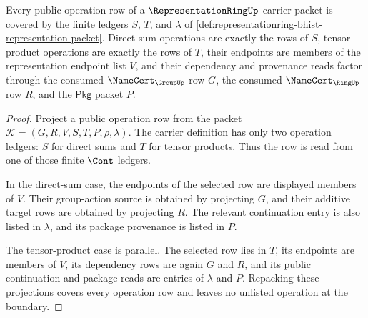 \begin{theorem}
\label{thm:representationring-operation-ledger-coverage}
Every public operation row of a $\RepresentationRingUp$ carrier packet is
covered by the finite ledgers $S$, $T$, and $\lambda$ of
\autoref{def:representationring-bhist-representation-packet}. Direct-sum
operations are exactly the rows of $S$, tensor-product operations are exactly
the rows of $T$, their endpoints are members of the representation endpoint
list $V$, and their dependency and provenance reads factor through the
consumed $\NameCert_{\GroupUp}$ row $G$, the consumed $\NameCert_{\RingUp}$
row $R$, and the $\mathsf{Pkg}$ packet $P$.
\end{theorem}
\begin{proof}
Project a public operation row from the packet
$\mathcal{K}=(G,R,V,S,T,P,\rho,\lambda)$. The carrier definition has only two
operation ledgers: $S$ for direct sums and $T$ for tensor products. Thus the
row is read from one of those finite $\Cont$ ledgers.

In the direct-sum case, the endpoints of the selected row are displayed
members of $V$. Their group-action source is obtained by projecting $G$, and
their additive target rows are obtained by projecting $R$. The relevant
continuation entry is also listed in $\lambda$, and its package provenance is
listed in $P$.

The tensor-product case is parallel. The selected row lies in $T$, its
endpoints are members of $V$, its dependency rows are again $G$ and $R$, and
its public continuation and package reads are entries of $\lambda$ and $P$.
Repacking these projections covers every operation row and leaves no
unlisted operation at the boundary.
\end{proof}

